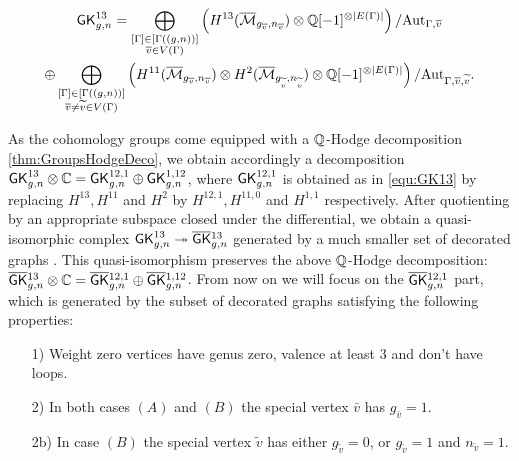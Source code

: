 \begin{multline}\label{equ:GK13}
    \mathsf{GK}^{13}_{g,n}
    = \bigoplus_{\substack{ [\Gamma]\in[\Gamma((g,n))] \\ \overline{v}\in V(\Gamma)}}
    \left( H^{13}(\overline{\mathcal{M}}_{g_{\overline{v}},n_{\overline{v}}}) \otimes \mathbb{Q}[-1]^{\otimes |E(\Gamma)|} \right)/\text{Aut}_{\Gamma,\overline{v}} \\
    \oplus \bigoplus_{\substack{ [\Gamma]\in[\Gamma((g,n))] \\ \overline{v}\neq\widetilde{v}\in V(\Gamma)}}
    \left( H^{11}(\overline{\mathcal{M}}_{g_{\overline{v}},n_{\overline{v}}}) \otimes H^{2}(\overline{\mathcal{M}}_{g_{\widetilde{v}},n_{\widetilde{v}}}) \otimes \mathbb{Q}[-1]^{\otimes |E(\Gamma)|} \right)/\text{Aut}_{\Gamma,\overline{v},\widetilde{v}} .
\end{multline}


As the cohomology groups come equipped with a $\mathbb{Q}$-Hodge decomposition \ref{thm:GroupsHodgeDeco}, we obtain accordingly a decomposition $\mathsf{GK}_{g,n}^{13}\otimes\mathbb{C} = \mathsf{GK}_{g,n}^{12,1} \oplus \mathsf{GK}_{g,n}^{1,12}$, where $\mathsf{GK}_{g,n}^{12,1}$ is obtained as in \ref{equ:GK13} by replacing $H^{13}, H^{11}$ and $H^{2}$ by $H^{12,1}, H^{11,0}$ and $H^{1,1}$ respectively. After quotienting by an appropriate subspace closed under the differential, we obtain a quasi-isomorphic complex $\mathsf{GK}_{g,n}^{13}\twoheadrightarrow \overline{\mathsf{GK}}{}_{g,n}^{13}$ generated by a much smaller set of decorated graphs \cite[Section 2.2]{CLPW2}. This quasi-isomorphism preserves the above $\mathbb{Q}$-Hodge decomposition: $\overline{\mathsf{GK}}{}_{g,n}^{13}\otimes\mathbb{C} = \overline{\mathsf{GK}}{}_{g,n}^{12,1} \oplus \overline{\mathsf{GK}}{}_{g,n}^{1,12}$. From now on we will focus on the $\overline{\mathsf{GK}}{}_{g,n}^{12,1}$ part, which is generated by the subset of decorated graphs satisfying the following properties:

\begin{enumerate}
    \item[1)] Weight zero vertices have genus zero, valence at least $3$ and don't have loops.
    \item[2)] In both cases $(A)$ and $(B)$ the special vertex $\bar{v}$ has $g_{\bar{v}}=1$.
    \item[2b)] In case $(B)$ the special vertex $\tilde{v}$ has either $g_{\tilde{v}}=0$, or $g_{\tilde{v}}=1$ and $n_{\tilde{v}}=1$.
\end{enumerate}

